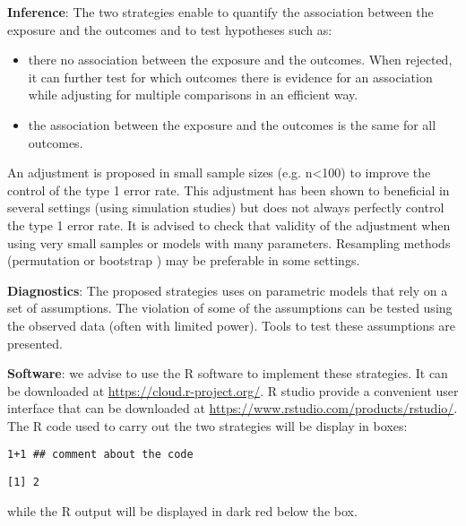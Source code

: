 \documentclass{article}
\begin{document}
\textbf{Inference}: The two strategies enable to quantify the association
between the exposure and the outcomes and to test hypotheses such as:
\begin{itemize}
\item there no association between the exposure and the outcomes. When
rejected, it can further test for which outcomes there is evidence for an
association while adjusting for multiple comparisons in an efficient
way.
\item the association between the exposure and the outcomes is the same for all outcomes.
\end{itemize}
An adjustment is proposed in small sample sizes (e.g. n<100) to
improve the control of the type 1 error rate. This adjustment
has been shown to beneficial in several settings (using simulation
studies) but does not always perfectly control the type 1 error
rate. It is advised to check that validity of the adjustment when
using very small samples or models with many parameters. Resampling
methods (permutation or bootstrap \citep{carpenter2000bootstrap}) may be
preferable in some settings.

\bigskip

\textbf{Diagnostics}: The proposed strategies uses on parametric models that
rely on a set of assumptions. The violation of some of the assumptions
can be tested using the observed data (often with limited
power). Tools to test these assumptions are presented.

\bigskip

\textbf{Software}: we advise to use the R software to implement these
strategies. It can be downloaded at \url{https://cloud.r-project.org/}. R
studio provide a convenient user interface that can be downloaded at
\url{https://www.rstudio.com/products/rstudio/}.  The R code used to carry
out the two strategies will be display in boxes:
\lstset{language=r,label= ,caption= ,captionpos=b,numbers=none}
\begin{lstlisting}
1+1 ## comment about the code
\end{lstlisting}

\begin{verbatim}
[1] 2
\end{verbatim}

while the R output will be displayed in dark red below the box. 


\bigskip
\end{document}
